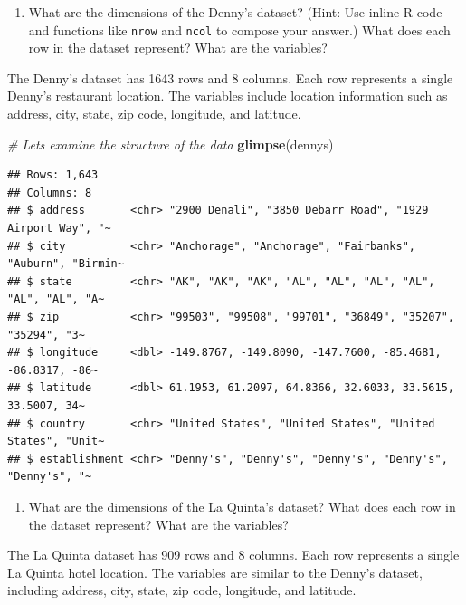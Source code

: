 \documentclass[
]{article}
\newenvironment{Shaded}{\begin{snugshade}}{\end{snugshade}}
\newcommand{\CommentTok}[1]{\textcolor[rgb]{0.56,0.35,0.01}{\textit{#1}}}
\newcommand{\FunctionTok}[1]{\textcolor[rgb]{0.13,0.29,0.53}{\textbf{#1}}}
\newcommand{\NormalTok}[1]{#1}
\providecommand{\tightlist}{%
  \setlength{\itemsep}{0pt}\setlength{\parskip}{0pt}}
\begin{document}
\begin{enumerate}
\def\labelenumi{\arabic{enumi}.}
\tightlist
\item
  What are the dimensions of the Denny's dataset? (Hint: Use inline R
  code and functions like \texttt{nrow} and \texttt{ncol} to compose
  your answer.) What does each row in the dataset represent? What are
  the variables?
\end{enumerate}

The Denny's dataset has 1643 rows and 8 columns. Each row represents a
single Denny's restaurant location. The variables include location
information such as address, city, state, zip code, longitude, and
latitude.

\begin{Shaded}
\begin{Highlighting}[]
\CommentTok{\# Let\textquotesingle{}s examine the structure of the data}
\FunctionTok{glimpse}\NormalTok{(dennys)}
\end{Highlighting}
\end{Shaded}

\begin{verbatim}
## Rows: 1,643
## Columns: 8
## $ address       <chr> "2900 Denali", "3850 Debarr Road", "1929 Airport Way", "~
## $ city          <chr> "Anchorage", "Anchorage", "Fairbanks", "Auburn", "Birmin~
## $ state         <chr> "AK", "AK", "AK", "AL", "AL", "AL", "AL", "AL", "AL", "A~
## $ zip           <chr> "99503", "99508", "99701", "36849", "35207", "35294", "3~
## $ longitude     <dbl> -149.8767, -149.8090, -147.7600, -85.4681, -86.8317, -86~
## $ latitude      <dbl> 61.1953, 61.2097, 64.8366, 32.6033, 33.5615, 33.5007, 34~
## $ country       <chr> "United States", "United States", "United States", "Unit~
## $ establishment <chr> "Denny's", "Denny's", "Denny's", "Denny's", "Denny's", "~
\end{verbatim}

\begin{enumerate}
\def\labelenumi{\arabic{enumi}.}
\setcounter{enumi}{1}
\tightlist
\item
  What are the dimensions of the La Quinta's dataset? What does each row
  in the dataset represent? What are the variables?
\end{enumerate}

The La Quinta dataset has 909 rows and 8 columns. Each row represents a
single La Quinta hotel location. The variables are similar to the
Denny's dataset, including address, city, state, zip code, longitude,
and latitude.
\end{document}
